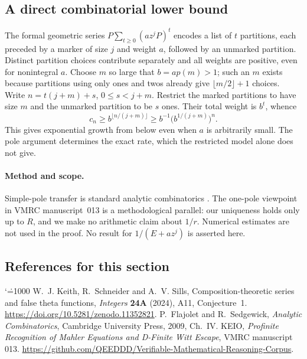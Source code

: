 \documentclass[11pt,a4paper]{article}
\makeatletter
\numberwithin{equation}{section}
\theoremstyle{definition}
\theoremstyle{remark}
\renewenvironment{thebibliography}[1]
 {\subsection*{References for this section}\small
  \list{\@biblabel{\@arabic\c@enumiv}}
       {\settowidth\labelwidth{\@biblabel{#1}}\leftmargin\labelwidth
        \advance\leftmargin\labelsep\@openbib@code
        \usecounter{enumiv}\let\p@enumiv\@empty
        \renewcommand\theenumiv{\@arabic\c@enumiv}}
  \sloppy\clubpenalty4000\widowpenalty4000\sfcode`\.=1000\relax}
 {\def\@noitemerr{\@latex@warning{Empty bibliography}}\endlist}
\makeatother
\begin{document}
\subsection*{A direct combinatorial lower bound}
The formal geometric series $P\sum_{t\ge0}(az^j P)^t$ encodes a
list of $t$ partitions, each preceded by a marker of size $j$ and
weight $a$, followed by an unmarked partition. Distinct partition choices
contribute separately and all weights are positive, even for nonintegral
$a$. Choose $m$ so large that $b=a p(m)>1$; such an $m$ exists because
partitions using only ones and twos already give $\lfloor m/2\rfloor+1$
choices. Write $n=t(j+m)+s$, $0\le s<j+m$. Restrict the marked
partitions to have size $m$ and the unmarked partition to be $s$ ones.
Their total weight is $b^t$, whence
\[
  c_n\ge b^{\lfloor n/(j+m)\rfloor}
       \ge b^{-1}\bigl(b^{1/(j+m)}\bigr)^n .
\]
This gives exponential growth from below even when $a$ is arbitrarily
small. The pole argument determines the exact rate, which the restricted
model alone does not give.
\paragraph{Method and scope.}
Simple-pole transfer is standard analytic combinatorics \cite{r26taisho:FS}.
The one-pole viewpoint in VMRC manuscript~013 \cite{r26taisho:VMRC} is a
methodological parallel: our uniqueness holds only up to $R$, and we
make no arithmetic claim about $1/r$. Numerical estimates are not
used in the proof. No result for $1/(E+az^j)$ is asserted here.
\begin{thebibliography}{9}
 W.~J. Keith, R.~Schneider and A.~V. Sills,
Composition-theoretic series and false theta functions,
\emph{Integers} \textbf{24A} (2024), A11, Conjecture~1.
\url{https://doi.org/10.5281/zenodo.11352821}.
 P.~Flajolet and R.~Sedgewick, \emph{Analytic Combinatorics},
Cambridge University Press, 2009, Ch.~IV.
 KEIO, \emph{Profinite Recognition of Mahler Equations
and D-Finite Witt Escape}, VMRC manuscript 013.
\url{https://github.com/QEEDDD/Verifiable-Mathematical-Reasoning-Corpus}.
\end{thebibliography}

\par\endgroup

\begingroup
\newcommand{\Z}{\mathbb Z}
\end{document}
